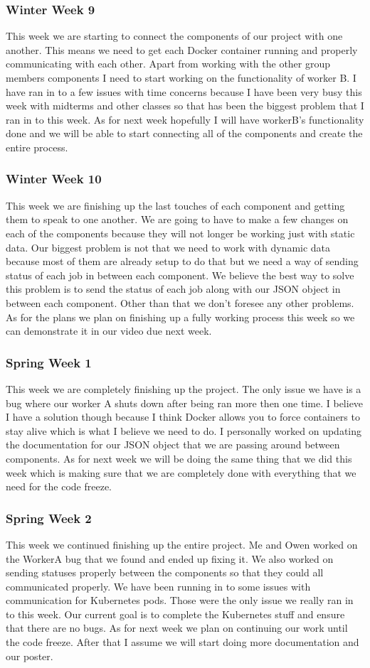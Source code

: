 \documentclass[onecolumn, draftclsnofoot,10pt, compsoc]{IEEEtran}
\begin{document}
\subsubsection*{Winter Week 9}
This week we are starting to connect the components of our project with one another. This means we need to get each Docker container running and properly communicating with each other. Apart from working with the other group members components I need to start working on the functionality of worker B. I have ran in to a few issues with time concerns because I have been very busy this week with midterms and other classes so that has been the biggest problem that I ran in to this week. As for next week hopefully I will have workerB's functionality done and we will be able to start connecting all of the components and create the entire process.
\subsubsection*{Winter Week 10}
This week we are finishing up the last touches of each component and getting them to speak to one another. We are going to have to make a few changes on each of the components because they will not longer be working just with static data. Our biggest problem is not that we need to work with dynamic data because most of them are already setup to do that but we need a way of sending status of each job in between each component. We believe the best way to solve this problem is to send the status of each job along with our JSON object in between each component. Other than that we don't foresee any other problems. As for the plans we plan on finishing up a fully working process this week so we can demonstrate it in our video due next week.
\subsubsection*{Spring Week 1}
This week we are completely finishing up the project. The only issue we have is a bug where our worker A shuts down after being ran more then one time. I believe I have a solution though because I think Docker allows you to force containers to stay alive which is what I believe we need to do. I personally worked on updating the documentation for our JSON object that we are passing around between components. As for next week we will be doing the same thing that we did this week which is making sure that we are completely done with everything that we need for the code freeze. 
\subsubsection*{Spring Week 2}
This week we continued finishing up the entire project. Me and Owen worked on the WorkerA bug that we found and ended up fixing it. We also worked on sending statuses properly between the components so that they could all communicated properly. We have been running in to some issues with communication for Kubernetes pods. Those were the only issue we really ran in to this week. Our current goal is to complete the Kubernetes stuff and ensure that there are no bugs. As for next week we plan on continuing our work until the code freeze. After that I assume we will start doing more documentation and our poster.
\end{document}
